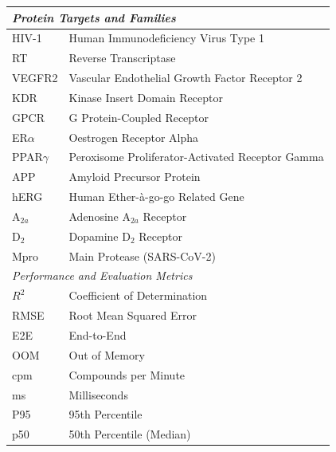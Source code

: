 \documentclass[conference]{IEEEtran}
\begin{document}
\begin{table}[!htbp]
{\begin{tabular}{p{2.2cm} p{6.2cm}}
\midrule
\multicolumn{2}{l}{\textit{Protein Targets and Families}} \\
\midrule
HIV-1      & Human Immunodeficiency Virus Type 1 \\
RT         & Reverse Transcriptase \\
VEGFR2     & Vascular Endothelial Growth Factor
             Receptor 2 \\
KDR        & Kinase Insert Domain Receptor \\
GPCR       & G Protein-Coupled Receptor \\
ER$\alpha$ & Oestrogen Receptor Alpha \\
PPAR$\gamma$ & Peroxisome Proliferator-Activated
               Receptor Gamma \\
APP        & Amyloid Precursor Protein \\
hERG       & Human Ether-à-go-go Related Gene \\
A$_{2a}$   & Adenosine A$_{2a}$ Receptor \\
D$_2$      & Dopamine D$_2$ Receptor \\
Mpro       & Main Protease (SARS-CoV-2) \\

\midrule
\multicolumn{2}{l}{\textit{Performance and Evaluation Metrics}} \\
\midrule
$R^2$      & Coefficient of Determination \\
RMSE       & Root Mean Squared Error \\
E2E        & End-to-End \\
OOM        & Out of Memory \\
cpm        & Compounds per Minute \\
ms         & Milliseconds \\
P95        & 95th Percentile \\
p50        & 50th Percentile (Median) \\


\end{tabular}}
\end{table}
\end{document}
